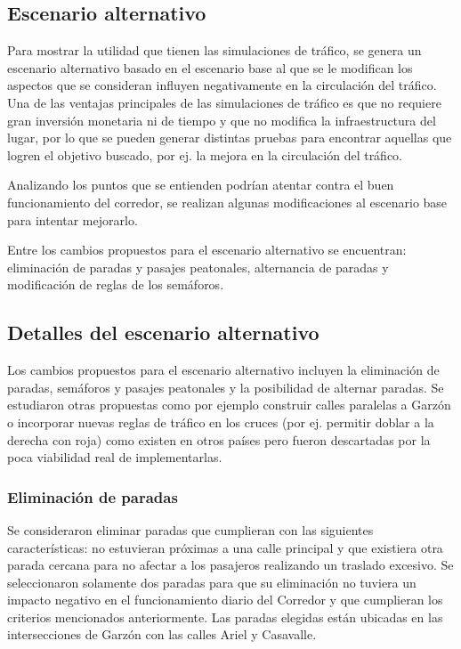 \subsection{Escenario alternativo}

Para mostrar la utilidad que tienen las simulaciones de tráfico, se genera un escenario alternativo basado en el escenario base al que se le modifican los aspectos que se consideran influyen negativamente en la circulación del tráfico. Una de las ventajas principales de las simulaciones de tráfico es que no requiere gran inversión monetaria ni de tiempo y que no modifica la infraestructura del lugar, por lo que se pueden generar distintas pruebas para encontrar aquellas que logren el objetivo buscado, por ej. la mejora en la circulación del tráfico.

Analizando los puntos que se entienden podrían atentar contra el buen funcionamiento del corredor, se realizan algunas modificaciones al escenario base para intentar mejorarlo. 

Entre los cambios propuestos para el escenario alternativo se encuentran: eliminación de paradas y pasajes peatonales, alternancia de paradas y modificación de reglas de los semáforos.

\subsection{Detalles del escenario alternativo}
Los cambios propuestos para el escenario alternativo incluyen la eliminación de paradas, semáforos y pasajes peatonales y la posibilidad de alternar paradas. Se estudiaron otras propuestas como por ejemplo construir calles paralelas a Garzón o incorporar nuevas reglas de tráfico en los cruces (por ej. permitir doblar a la derecha con roja) como existen en otros países pero fueron descartadas por la poca viabilidad real de implementarlas.

\subsubsection{Eliminación de paradas}
Se consideraron eliminar paradas que cumplieran con las siguientes características: no estuvieran próximas a una calle principal y que existiera otra parada cercana para no afectar a los pasajeros realizando un traslado excesivo.  Se seleccionaron solamente dos paradas para que su eliminación no tuviera un impacto negativo en el funcionamiento diario del Corredor y que cumplieran los criterios mencionados anteriormente. Las paradas elegidas están ubicadas en las intersecciones de Garzón con las calles Ariel y Casavalle.

